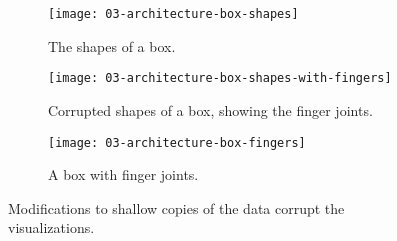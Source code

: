 \documentclass[../../ClassicThesis.tex]{subfiles}
\begin{document}
\begin{figure}[h]
  \centering
  \begin{subfigure}[b]{0.3222\textwidth}
    \texttt{[image: 03-architecture-box-shapes]}
    \caption{The shapes of a box.}
    \label{fig:corrupt:shapes}
  \end{subfigure}
  \begin{subfigure}[b]{0.3222\textwidth}
    \texttt{[image: 03-architecture-box-shapes-with-fingers]}
    \caption{Corrupted shapes of a box, showing the finger joints.}
    \label{fig:corrupt:shapes-fingers}
  \end{subfigure}
  \begin{subfigure}[b]{0.3222\textwidth}
    \texttt{[image: 03-architecture-box-fingers]}
    \caption{A box with finger joints.}
    \label{fig:corrupt:fingers}
  \end{subfigure}
  \caption{Modifications to shallow copies of the data
    corrupt the visualizations.}
  \label{fig:corrupt}
\end{figure}




\end{document}
